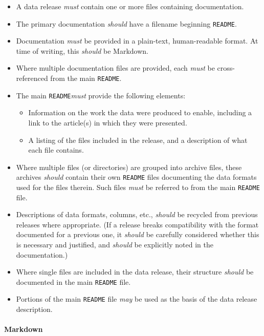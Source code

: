 \documentclass{article}
\newcommand\rfcword[1]{\emph{#1}\xspace}
\newcommand\must{\rfcword{must}}
\newcommand\should{\rfcword{should}}
\newcommand\may{\rfcword{may}}
\newcommand\filename[1]{\texttt{#1}\xspace}
\newcommand\readme{\filename{README}}
\begin{document}
\begin{itemize}
  \item
        A data release \must contain one or more files containing documentation.
  \item
        The primary documentation \should have a filename beginning \readme.
  \item
        Documentation \must be provided in a plain-text, human-readable format.
        At time of writing,
        this \should be Markdown.
  \item
        Where multiple documentation files are provided,
        each \must be cross-referenced from the main \readme.
  \item
        The main \readme \must provide the following elements:
        \begin{itemize}
          \item
                Information on the work the data were produced to enable,
                including a link to the article(s) in which they were presented.
          \item
                A listing of the files included in the release,
                and a description of what each file contains.
        \end{itemize}
  \item
        Where multiple files (or directories) are grouped into archive files,
        these archives \should contain their own \readme files
        documenting the data formats used for the files therein.
        Such files \must be referred to from the main \readme file.
  \item
        Descriptions of data formats, columns, etc.,
        \should be recycled from previous releases where appropriate.
        (If a release breaks compatibility with the format documented for a previous one,
        it \should be carefully considered whether this is necessary and justified,
        and \should be explicitly noted in the documentation.)
  \item
        Where single files are included in the data release,
        their structure \should be documented in the main \readme file.
  \item
        Portions of the main \readme file \may be used as
        the basis of the data release description.
\end{itemize}

\paragraph{Markdown}
\end{document}
